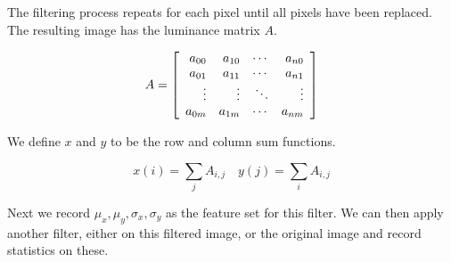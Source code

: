 The filtering process repeats for each pixel until all pixels have been replaced.
The resulting image has the luminance matrix $A$.

\[A = \left [
    \begin{array}{r r r r}
        a_{00} & a_{10} & \cdots & a_{n0} \\
        a_{01} & a_{11} & \cdots & a_{n1}\\
        \vdots  & \vdots  & \ddots & \vdots\\
        a_{0m} & a_{1m} & \cdots & a_{nm}\\
    \end{array}
\right ] \]

We define $x$ and $y$ to be the row and column sum functions.

\begin{equation}
x(i) = \sum_{j}{A_{i,j}} \quad
y(j) = \sum_{i}{A_{i,j}}
\end{equation}

Next we record $\mu_x, \mu_y, \sigma_x, \sigma_y$ as the feature set for this filter.
We can then apply another filter, either on this filtered image, or the original image
and record statistics on these.
